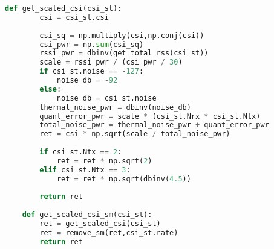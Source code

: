 \documentclass[UTF8]{article}
\begin{document}
\begin{lstlisting}[language=Python, caption=$ get\_scaled\_csi.py $]
    def get_scaled_csi(csi_st):
        csi = csi_st.csi
    
        csi_sq = np.multiply(csi,np.conj(csi))
        csi_pwr = np.sum(csi_sq)
        rssi_pwr = dbinv(get_total_rss(csi_st))
        scale = rssi_pwr / (csi_pwr / 30)
        if csi_st.noise == -127:
            noise_db = -92
        else:
            noise_db = csi_st.noise
        thermal_noise_pwr = dbinv(noise_db)
        quant_error_pwr = scale * (csi_st.Nrx * csi_st.Ntx)
        total_noise_pwr = thermal_noise_pwr + quant_error_pwr
        ret = csi * np.sqrt(scale / total_noise_pwr)
    
        if csi_st.Ntx == 2:
            ret = ret * np.sqrt(2)
        elif csi_st.Ntx == 3:
            ret = ret * np.sqrt(dbinv(4.5))
        
        return ret
    
    def get_scaled_csi_sm(csi_st):
        ret = get_scaled_csi(csi_st)
        ret = remove_sm(ret,csi_st.rate)
        return ret
\end{lstlisting}
\end{document}
